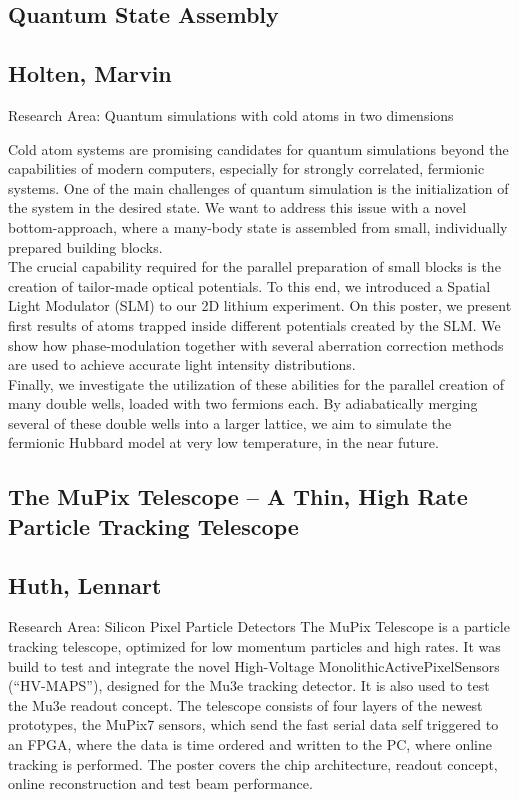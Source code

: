 \subsection*{\centering \large Quantum State Assembly}
\subsection*{\centering \normalsize Holten, Marvin}
Research Area: Quantum simulations with cold atoms in two dimensions\newline

\noindent Cold atom systems are promising candidates for quantum simulations beyond the capabilities of modern computers, especially for strongly correlated, fermionic systems. One of the main challenges of quantum simulation is the initialization of the system in the desired state. We want to address this issue with a novel bottom-approach, where a many-body state is assembled from small, individually prepared building blocks.\\The crucial capability required for the parallel preparation of small blocks is the creation of tailor-made optical potentials. To this end, we introduced a Spatial Light Modulator (SLM) to our 2D lithium experiment. On this poster, we present first results of atoms trapped inside different potentials created by the SLM. We show how phase-modulation together with several aberration correction methods are used to achieve accurate light intensity distributions. \\Finally, we investigate the utilization of these abilities for the parallel creation of many double wells, loaded with two fermions each. By adiabatically merging several of these double wells into a larger lattice, we aim to simulate the fermionic Hubbard model at very low temperature, in the near future.
\newpage
\subsection*{\centering \large  The MuPix Telescope – A Thin, High Rate Particle Tracking Telescope }
\subsection*{\centering \normalsize Huth, Lennart}
Research Area:  Silicon Pixel Particle Detectors
\newline
\noindent The MuPix Telescope is a particle tracking telescope, optimized for low momentum particles and high rates. It was build to test and integrate the novel High-Voltage MonolithicActivePixelSensors (“HV-MAPS”), designed for the Mu3e tracking detector. It is also used to test the Mu3e readout concept.
The telescope consists of four layers of the newest prototypes, the MuPix7 sensors, which send the fast serial data self triggered to an FPGA, where the data is time ordered and written to the PC, where online tracking is performed.
The poster covers the chip architecture, readout concept, online reconstruction and test beam performance.


